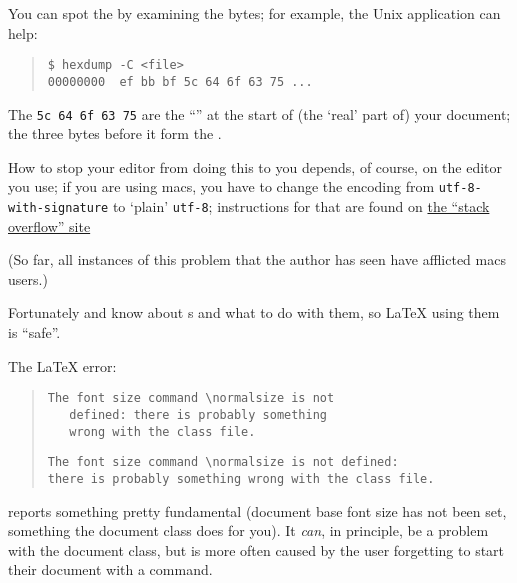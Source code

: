 {You can spot the  by examining the bytes; for example, the
Unix  application can help:
\begin{quote}
\begin{verbatim}
$ hexdump -C <file>
00000000  ef bb bf 5c 64 6f 63 75 ...
\end{verbatim}
\end{quote}
The \texttt{5c 64 6f 63 75} are the ``'' at the start of
(the `real' part of) your document; the three bytes before it form the
.

How to stop your editor from doing this to you depends, of course, on
the editor you use; if you are using macs, you have to
change the encoding from \texttt{utf-8-with-signature} to `plain'
\texttt{utf-8}; instructions for that are found on
\href{http://stackoverflow.com/questions/3859274/}{the ``stack overflow'' site}

(So far, all instances of this problem that the author has seen have
afflicted macs users.)

Fortunately \xetex{} and \LuaTeX{} know about s and what to
do with them, so \LaTeX{} using them is ``safe''.


The \LaTeX{} error:
\begin{quote}
\begin{narrowversion}
\begin{verbatim}
The font size command \normalsize is not
   defined: there is probably something
   wrong with the class file.
\end{verbatim}
\end{narrowversion}
\begin{wideversion}
\begin{verbatim}
The font size command \normalsize is not defined:
there is probably something wrong with the class file.
\end{verbatim}
\end{wideversion}
\end{quote}
reports something pretty fundamental (document base font size has not
been set, something the document class does for you).  It \emph{can},
in principle, be a problem with the document class, but is more often
caused by the user forgetting to start their document with a
 command.


}
